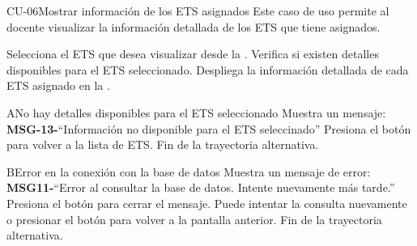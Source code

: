 

\begin{UseCase}{CU-06}{Mostrar información de los ETS asignados}{
		Este caso de uso permite al docente visualizar la información detallada de los ETS que tiene asignados.
	}
\end{UseCase}
\begin{UCtrayectoria}
	\UCpaso[\UCactor] Selecciona el ETS que desea visualizar desde la .
	\UCpaso[\UCsist] Verifica si existen detalles disponibles para el ETS seleccionado. 
	\UCpaso Despliega la información detallada de cada ETS asignado en la .
\end{UCtrayectoria}
\begin{UCtrayectoriaA}{A}{No hay detalles disponibles para el ETS seleccionado}
	\UCpaso Muestra un mensaje: {\bf MSG-13-}{``Información no disponible para el ETS seleccinado''}
	\UCpaso[\UCactor] Presiona el botón  para volver a la lista de ETS.
	\UCpaso Fin de la trayectoria alternativa.
\end{UCtrayectoriaA}

\begin{UCtrayectoriaA}{B}{Error en la conexión con la base de datos}
	\UCpaso Muestra un mensaje de error: {\bf MSG11-}{``Error al consultar la base de datos. Intente nuevamente más tarde.''}
	\UCpaso[\UCactor] Presiona el botón  para cerrar el mensaje.
	\UCpaso[\UCactor] Puede intentar la consulta nuevamente o presionar el botón  para volver a la pantalla anterior.
	\UCpaso Fin de la trayectoria alternativa.
\end{UCtrayectoriaA}

